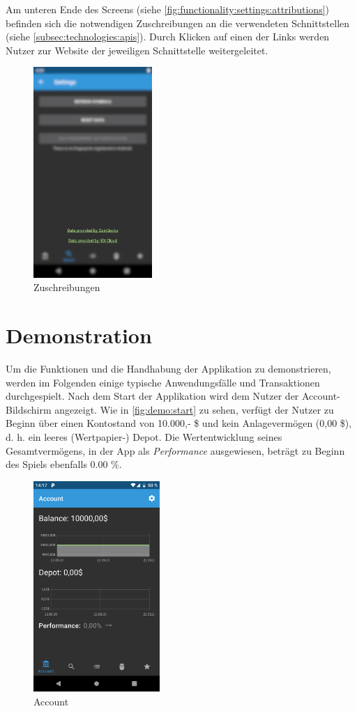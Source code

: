 \documentclass[a4paper]{article}
\begin{document}
Am unteren Ende des Screens (siehe \autoref{fig:functionality:settings:attributions}) befinden sich die notwendigen Zuschreibungen an die verwendeten Schnittstellen (siehe \autoref{subsec:technologies:apis}).
Durch Klicken auf einen der Links werden Nutzer zur Website der jeweiligen Schnittstelle weitergeleitet.

\begin{figure}[H]
    \centering
    \includegraphics[width=.5\textwidth,height=8cm,keepaspectratio]{./images/settings/attribution.png}
    \caption{Zuschreibungen}
    \label{fig:functionality:settings:attributions}
\end{figure}

\section{Demonstration}
\label{sec:demo}
Um die Funktionen und die Handhabung der Applikation zu demonstrieren, werden im Folgenden einige typische Anwendungsfälle und Transaktionen durchgespielt. Nach dem Start der Applikation wird dem Nutzer der Account-Bildschirm angezeigt. Wie in \autoref{fig:demo:start} zu sehen, verfügt der Nutzer zu Beginn über einen Kontostand von 10.000,- \$ und kein Anlagevermögen (0,00 \$), d. h. ein leeres (Wertpapier-) Depot. Die Wertentwicklung seines Gesamtvermögens, in der App als \textit{Performance} ausgewiesen, beträgt zu Beginn des Spiels ebenfalls 0.00 \%.

\begin{figure}[H]
	\centering
	\includegraphics[width=.5\textwidth,height=8cm,keepaspectratio]{./images/demo/start.png}
	\caption{Account}
	\label{fig:demo:start}
\end{figure}
\end{document}
